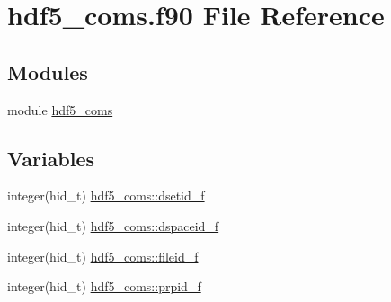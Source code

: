 \hypertarget{preproc_2ascii2hdf_2hdf5__coms_8_f90}{}\section{hdf5\+\_\+coms.\+f90 File Reference}
\label{preproc_2ascii2hdf_2hdf5__coms_8_f90}
\subsection*{Modules}
\begin{DoxyCompactItemize}
\item 
module \hyperlink{namespacehdf5__coms}{hdf5\+\_\+coms}
\end{DoxyCompactItemize}
\subsection*{Variables}
\begin{DoxyCompactItemize}
\item 
integer(hid\+\_\+t) \hyperlink{namespacehdf5__coms_a31611e38319474913c7422e2cf240a25}{hdf5\+\_\+coms\+::dsetid\+\_\+f}
\item 
integer(hid\+\_\+t) \hyperlink{namespacehdf5__coms_ad7b71a5a383dba57521ae99e69fe792c}{hdf5\+\_\+coms\+::dspaceid\+\_\+f}
\item 
integer(hid\+\_\+t) \hyperlink{namespacehdf5__coms_a5bdf3f7a13856c782dc68d5c2bffccb4}{hdf5\+\_\+coms\+::fileid\+\_\+f}
\item 
integer(hid\+\_\+t) \hyperlink{namespacehdf5__coms_a84009e52b52f9347b40c3e5d71cb1eb0}{hdf5\+\_\+coms\+::prpid\+\_\+f}
\end{DoxyCompactItemize}
